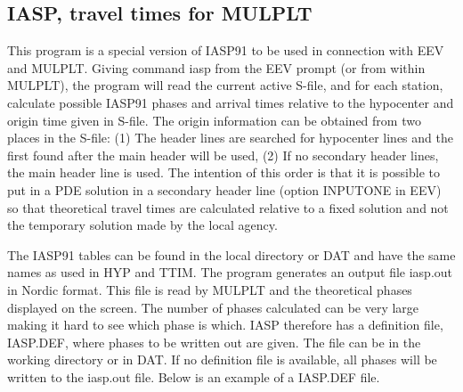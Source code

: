 
\subsection{IASP, travel times for MULPLT} 
\label{subs:iasp}

This program is a special version of IASP91 to be used in connection with EEV and MULPLT. Giving command iasp from the EEV prompt (or from within MULPLT), the program will read the current active S-file, and for each station, calculate possible IASP91 phases and arrival times relative to the hypocenter and origin time given in S-file. The origin information can be obtained from two places in the S-file: (1) The header lines are searched for hypocenter lines and the first found after the main header will be used, (2) If no secondary header lines, the main header line is used. The intention of this order is that it is possible to put in a PDE solution in a secondary header line (option INPUTONE in EEV) so that theoretical travel times are calculated relative to a fixed solution and not the temporary solution made by the local agency. 

The IASP91 tables can be found in the local directory or DAT and have the same names as used in HYP and TTIM. The program generates an output file iasp.out in Nordic format. This file is read by MULPLT and the theoretical phases displayed on the screen. The number of phases calculated can be very large making it hard to see which phase is which. IASP therefore has a definition file, IASP.DEF, where phases to be written out are given. The file can be in the working directory or in DAT. If no definition file is available, all phases will be written to the iasp.out file. Below is an example of a IASP.DEF file. 



